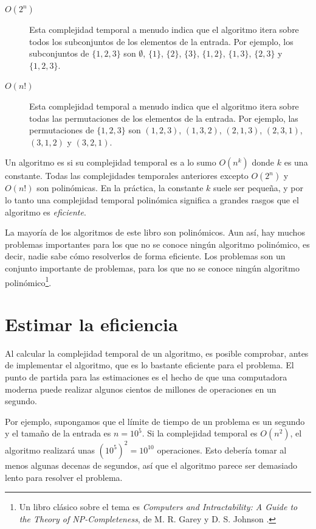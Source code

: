 \begin{description}
\item[$O(2^n)$]
Esta complejidad temporal a menudo indica que
el algoritmo itera sobre todos los
subconjuntos de los elementos de la entrada.
Por ejemplo, los subconjuntos de $\{1,2,3\}$ son
$\emptyset$, $\{1\}$, $\{2\}$, $\{3\}$, $\{1,2\}$,
$\{1,3\}$, $\{2,3\}$ y $\{1,2,3\}$.

\item[$O(n!)$]
Esta complejidad temporal a menudo indica que
el algoritmo itera sobre todas las
permutaciones de los elementos de la entrada.
Por ejemplo, las permutaciones de $\{1,2,3\}$ son
$(1,2,3)$, $(1,3,2)$, $(2,1,3)$, $(2,3,1)$,
$(3,1,2)$ y $(3,2,1)$.

\end{description}

Un algoritmo es 
si su complejidad temporal es a lo sumo $O(n^k)$
donde $k$ es una constante.
Todas las complejidades temporales anteriores excepto
$O(2^n)$ y $O(n!)$ son polinómicas.
En la práctica, la constante $k$ suele ser pequeña,
y por lo tanto una complejidad temporal polinómica
significa a grandes rasgos que el algoritmo es \emph{eficiente}.


La mayoría de los algoritmos de este libro son polinómicos.
Aun así, hay muchos problemas importantes para los que
no se conoce ningún algoritmo polinómico, es decir,
nadie sabe cómo resolverlos de forma eficiente.
Los problemas  son un conjunto importante
de problemas, para los que no se conoce ningún algoritmo
polinómico\footnote{Un libro clásico sobre el tema es
\emph{Computers and Intractability: A Guide to the Theory
of NP-Completeness}, de M. R. Garey y D. S. Johnson \cite{gar79}.}.

\section{Estimar la eficiencia}

Al calcular la complejidad temporal de un algoritmo,
es posible comprobar, antes de
implementar el algoritmo, que es
lo bastante eficiente para el problema.
El punto de partida para las estimaciones es el hecho de que
una computadora moderna puede realizar algunos cientos de
millones de operaciones en un segundo.

Por ejemplo, supongamos que el límite de tiempo de
un problema es un segundo y el tamaño de la entrada es $n=10^5$.
Si la complejidad temporal es $O(n^2)$,
el algoritmo realizará unas $(10^5)^2=10^{10}$ operaciones.
Esto debería tomar al menos algunas decenas de segundos,
así que el algoritmo parece ser demasiado lento para resolver el problema.

